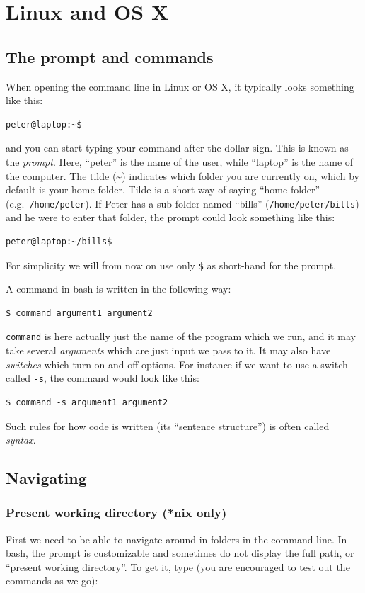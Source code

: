\section{Linux and OS X}

\subsection{The prompt and commands}
When opening the command line in Linux or OS X, it typically looks something like this:
\begin{verbatim}
peter@laptop:~$
\end{verbatim}
and you can start typing your command after the dollar sign. This is known as the \emph{prompt}. Here, ``peter'' is the name of the user, while ``laptop'' is the name of the computer. The tilde (\~{}) indicates which folder you are currently on, which by default is your home folder. Tilde is a short way of saying ``home folder'' (e.g.\ \verb|/home/peter|). If Peter has a sub-folder named ``bills'' (\verb|/home/peter/bills|) and he were to enter that folder, the prompt could look something like this:
\begin{verbatim}
peter@laptop:~/bills$
\end{verbatim}
For simplicity we will from now on use only \texttt{\$} as short-hand for the prompt.

A command in bash is written in the following way:

\begin{verbatim}
$ command argument1 argument2
\end{verbatim}

\verb|command| is here actually just the name of the program which we run, and it may take several \emph{arguments} which are just input we pass to it. It may also have \emph{switches} which turn on and off options. For instance if we want to use a switch called \verb|-s|, the command would look like this:

\begin{verbatim}
$ command -s argument1 argument2
\end{verbatim}
Such rules for how code is written (its ``sentence structure'') is often called \emph{syntax}. 

\subsection{Navigating}
\subsubsection{Present working directory (*nix only)}
First we need to be able to navigate around in folders in the command line. In bash, the prompt is customizable and sometimes do not display the full path, or ``present working directory''. To get it, type (you are encouraged to test out the commands as we go):

